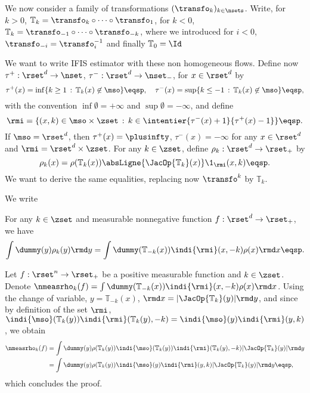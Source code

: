 
We now consider a family of transformations $(\transfo_k)_{k\in \nsets}$. Write, for $k>0$, $\mathbb{T}_k = \transfo_k\circ\dots\circ \transfo_1$, for $k<0$, $\mathbb{T}_k = \transfo_{-1}\circ\dots\circ \transfo_{-k}$, where we introduced for $i<0$, $\transfo_{-i}= \transfo_i^{-1}$ and finally $\mathbb{T}_0= \Id$

We want to write IFIS estimator with these non homogeneous flows.
 Define now
$\tau^{+} : \rset^d \to \nset$, $\tau^{-} : \rset^d \to \nset_-$, for
$x \in \rset^d$ by
\begin{equation}
\label{eq:definition-tau-+--}
\tau^{+}(x)=\inf\{k\geq 1\, :  \,  \mathbb{T}_k(x) \not \in \mso\} \eqsp, \quad \tau^{-}(x)=\sup\{k\leq -1\, :  \,  \mathbb{T}_k(x) \not \in \mso\} \eqsp,
\end{equation}
with the convention $\inf \emptyset = +\infty$ and
$\sup \emptyset = - \infty$, and define
\begin{equation}
  \label{eq:def_rmi}
  \rmi = \{(x,k) \in \mso\times \zset\,:\, k \in
\intentier{\tau^-(x)+1}{\tau^+(x)-1}\} \eqsp.
\end{equation}
If $\mso = \rset^{d}$, then $\tau^{+}(x) = \plusinfty$, $\tau^{-}(x) = -\infty$ for any $x \in \rset^d$ and
$\rmi = \rset^{d} \times \zset$. For any $k \in \zset$, define $\rho_k : \rset^d \to \rset_+$ by
\begin{equation}
\label{eq:definition-rho-k}
    \rho_k(x)= \rho(\mathbb{T}_k(x))  \absLigne{\JacOp{\mathbb{T}_k}(x)} \1_{\rmi}(x,k)\eqsp.
\end{equation}
We want to derive the same equalities, replacing now $\transfo^k$ by $\mathbb{T}_k$.


We write 
\begin{lemma}
\label{theo:inf_non_eq_0}
For any $k \in \zset$ and  measurable nonnegative function $f:\rset^d \to \rset_+$, we have
\begin{equation}
    \label{eq:inf_non_eq_av_0}
    \int \dummy(y)    \rho_k(y)\rmd y =
  \int \dummy(\mathbb{T}_{-k}(x)) \indi{\rmi}(x,-k)\rho(x)\rmd x  \eqsp.
\end{equation}
\end{lemma}


Let $f:\rset^n\to\rset_+$ be a positive measurable function and
  $k \in \zset$.  Denote
  $\nmeasrho_{k}(f)= \int \dummy(\mathbb{T}_{-k}(x)) \indi{\rmi}(x,-k)\rho(x)\rmd x$.
Using the change of variable, $y = \mathbb{T}_{-k}(x)$,
$\rmd x = |\JacOp{\mathbb{T}_k}(y)| \rmd y$, and since by definition of the set $\rmi$,
$\indi{\mso}(\mathbb{T}_k(y)) \indi{\rmi}(\mathbb{T}_k(y),-k) =
\indi{\mso}(y) \indi{\rmi}(y,k)$, we obtain
\begin{align*}
  \nmeasrho_{k}(f) &=
                       \int \dummy(y) \rho(\mathbb{T}_k(y)) \indi{\mso}(\mathbb{T}_k(y)) \indi{\rmi}(\mathbb{T}_k(y),-k) |\JacOp{\mathbb{T}_k}(y)|\rmd y\\
                       &= \int\dummy(y) \rho(\mathbb{T}_k(y)) \indi{\mso}(y) \indi{\rmi}(y,k) |\JacOp{\mathbb{T}_k}(y)|\rmd y\eqsp, 
\end{align*}
which concludes the proof.

